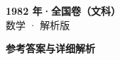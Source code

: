 \documentclass[zihao=-4, a4paper]{ctexart}
\begin{document}
\begin{center}
  {\Large\bfseries 1982 年·全国卷（文科）}\\[4pt]
  {\large 数学 · 解析版}
\end{center}
\medskip
{}

\clearpage
{}
\begin{center}{\Large\bfseries 参考答案与详细解析}\end{center}
\medskip

\end{document}
